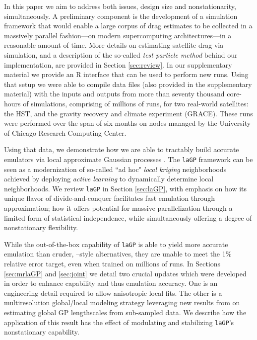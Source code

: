 \documentclass[12pt]{article}
\begin{document}
In this paper we aim to address both issues, design size and nonstationarity,
simultaneously.  A preliminary component is the development of a simulation
framework that would enable a large corpus of drag estimates to be collected
in a massively parallel fashion---on modern supercomputing architectures---in
a reasonable amount of time. More details on estimating satellite drag via
simulation, and a description of the so-called {\em test particle method}
behind our implementation, are provided in Section \ref{sec:review}.  In our
supplementary material we provide an {\sf R} interface that can be used to
perform new runs. Using that setup we were able to compile data files (also
provided in the supplementary material) with the inputs and outputs from more
than seventy thousand core-hours of simulations, comprising of millions of
runs, for two real-world satellites: the HST, and the gravity recovery and
climate experiment (GRACE).  These runs were performed over the span of six
months on nodes managed by the University of Chicago Research Computing
Center.

Using that data, we demonstrate how we are able to tractably build accurate
emulators via local approximate Gaussian processes
\citep{gramacy:apley:2015,laGP}. The {\tt laGP} framework can be seen as a
modernization of so-called ``ad hoc" {\em local kriging} neighborhoods
\citep[][pp.~131--134]{cressie:1993} achieved by deploying {\em active learning}
\citep{seo:etal:2000} to dynamically determine local neighborhoods.  We review {\tt laGP} in Section \ref{sec:laGP}, with
emphasis on how its unique flavor of divide-and-conquer facilitates
fast emulation through approximation; how it offers potential for massive
parallelization through a limited form of statistical independence, while simultaneously offering a degree of nonstationary flexibility.

While the out-of-the-box capability of {\tt laGP} is able to yield more
accurate emulation than cruder, \citet{metha:etal:2014}--style
alternatives, they are unable to meet the 1\% relative error target, even when
trained on millions of runs.  In Sections \ref{sec:mrlaGP} and \ref{sec:joint}
we detail two crucial updates which were developed in order to enhance
capability and thus emulation accuracy.  One is an engineering detail required
to allow anisotropic local fits. The other is a multiresolution
global/local modeling strategy leveraging new results from
\citet{liu:hung:2015} on estimating global GP lengthscales from sub-sampled data. We describe how the application of this
result has the effect of modulating and stabilizing {\tt laGP}'s nonstationary capability.
\end{document}
